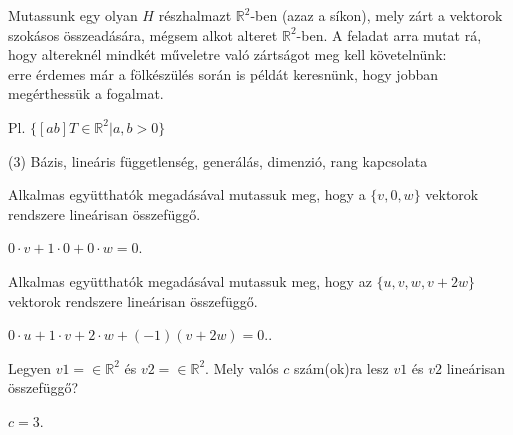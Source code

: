 \begin{frame}
  \begin{tcolorbox}[title={2/5. -Q-}]
      Mutassunk egy olyan $H$ részhalmazt $\mathbb{R}^2$-ben (azaz a síkon), mely zárt a vektorok szokásos összeadására, mégsem alkot alteret $\mathbb{R}^2$-ben.
  \tcblower
    A feladat arra mutat rá, hogy altereknél mindkét műveletre való zártságot meg kell követelnünk:\\
    
    erre érdemes már a fölkészülés során is példát keresnünk, hogy jobban megérthessük a fogalmat.
    \mmedskip 
    
    Pl. $\{[a b]T \in \mathbb{R}^2|a,b > 0\}$
  \end{tcolorbox}
\end{frame}


\begin{frame}[plain]
\begin{tcolorbox}[center, colback={myyellow}, coltext={black}, colframe={myyellow}]
    {\RHuge  (3) Bázis, lineáris függetlenség, generálás, dimenzió, rang kapcsolata}
    \mmedskip
\end{tcolorbox}
\end{frame}

\begin{frame}
  \begin{tcolorbox}[title={3/1. -N-}]
      Alkalmas együtthatók megadásával mutassuk meg, hogy a $\{v,0,w\}$ vektorok rendszere lineárisan összefüggő.
  \tcblower

    \mmedskip 
  
    $0 \cdot v + 1 \cdot 0 + 0 \cdot w = 0$.
  \end{tcolorbox}
\end{frame}


\begin{frame}
  \begin{tcolorbox}[title={3/2. -N-}]
       Alkalmas együtthatók megadásával mutassuk meg, hogy az $\{u,v,w,v+2w\}$ vektorok rendszere lineárisan összefüggő.
  \tcblower

    \mmedskip 
  
    $0 \cdot u + 1 \cdot v + 2 \cdot w + (−1)(v + 2w) = 0.$.
  \end{tcolorbox}
\end{frame}


\begin{frame}
  \begin{tcolorbox}[title={3/3. -N-}]
       Legyen $v1 =  \in \mathbb{R}^2$ és $v2 =  \in \mathbb{R}^2$. Mely valós $c$ szám(ok)ra lesz $v1$ és $v2$ lineárisan összefüggő?
  \tcblower

    \mmedskip 
  
    $c = 3$.
  \end{tcolorbox}
\end{frame}


